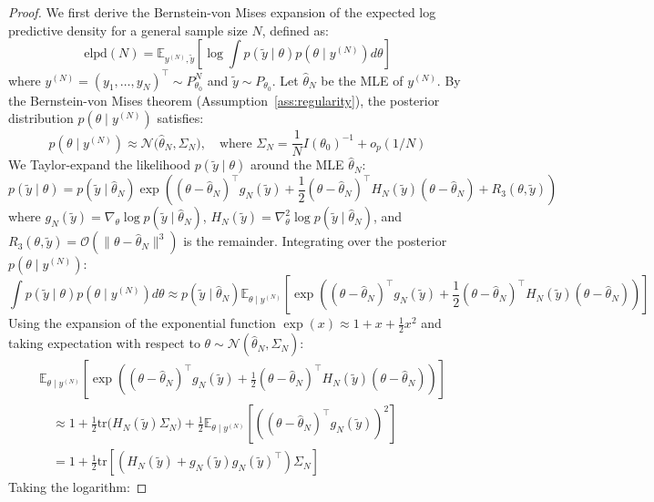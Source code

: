 \documentclass[12pt]{article}
\begin{document}
\begin{proof}
We first derive the Bernstein-von Mises expansion of the expected log predictive density for a general sample size $N$, defined as:
\[
\text{elpd}(N) = \mathbb{E}_{y^{(N)}, \tilde{y}} \left[ \log \int p(\tilde{y} \mid \theta) p(\theta \mid y^{(N)}) d\theta \right]
\]
where $y^{(N)} = (y_1, \dots, y_N)^\top \sim P_{\theta_0}^N$ and $\tilde{y} \sim P_{\theta_0}$. Let $\hat{\theta}_N$ be the MLE of $y^{(N)}$. By the Bernstein-von Mises theorem (Assumption~\ref{ass:regularity}), the posterior distribution $p(\theta \mid y^{(N)})$ satisfies:
\[
p(\theta \mid y^{(N)}) \approx \mathcal{N}\big(\hat{\theta}_N, \Sigma_N\big), \quad \text{where } \Sigma_N = \frac{1}{N} I(\theta_0)^{-1} + o_p(1/N)
\]
We Taylor-expand the likelihood $p(\tilde{y} \mid \theta)$ around the MLE $\hat{\theta}_N$:
\[
p(\tilde{y} \mid \theta) = p(\tilde{y} \mid \hat{\theta}_N) \exp\left( (\theta - \hat{\theta}_N)^\top g_N(\tilde{y}) + \frac{1}{2} (\theta - \hat{\theta}_N)^\top H_N(\tilde{y}) (\theta - \hat{\theta}_N) + R_3(\theta, \tilde{y}) \right)
\]
where $g_N(\tilde{y}) = \nabla_\theta \log p(\tilde{y} \mid \hat{\theta}_N)$, $H_N(\tilde{y}) = \nabla^2_\theta \log p(\tilde{y} \mid \hat{\theta}_N)$, and $R_3(\theta, \tilde{y}) = \mathcal{O}(\|\theta - \hat{\theta}_N\|^3)$ is the remainder. Integrating over the posterior $p(\theta \mid y^{(N)})$:
\[
\int p(\tilde{y} \mid \theta) p(\theta \mid y^{(N)}) d\theta \approx p(\tilde{y} \mid \hat{\theta}_N) \mathbb{E}_{\theta \mid y^{(N)}} \left[ \exp\left( (\theta - \hat{\theta}_N)^\top g_N(\tilde{y}) + \frac{1}{2} (\theta - \hat{\theta}_N)^\top H_N(\tilde{y}) (\theta - \hat{\theta}_N) \right) \right]
\]
Using the expansion of the exponential function $\exp(x) \approx 1 + x + \frac{1}{2} x^2$ and taking expectation with respect to $\theta \sim \mathcal{N}(\hat{\theta}_N, \Sigma_N)$:
\begin{align*}
&\mathbb{E}_{\theta \mid y^{(N)}} \left[ \exp\left( (\theta - \hat{\theta}_N)^\top g_N(\tilde{y}) + \frac{1}{2} (\theta - \hat{\theta}_N)^\top H_N(\tilde{y}) (\theta - \hat{\theta}_N) \right) \right] \\
&\quad \approx 1 + \frac{1}{2} \text{tr}\big(H_N(\tilde{y}) \Sigma_N\big) + \frac{1}{2} \mathbb{E}_{\theta \mid y^{(N)}} \left[ \left( (\theta - \hat{\theta}_N)^\top g_N(\tilde{y}) \right)^2 \right] \\
&\quad = 1 + \frac{1}{2} \text{tr}\left[ \left( H_N(\tilde{y}) + g_N(\tilde{y}) g_N(\tilde{y})^\top \right) \Sigma_N \right]
\end{align*}
Taking the logarithm:

\end{proof}
\end{document}
